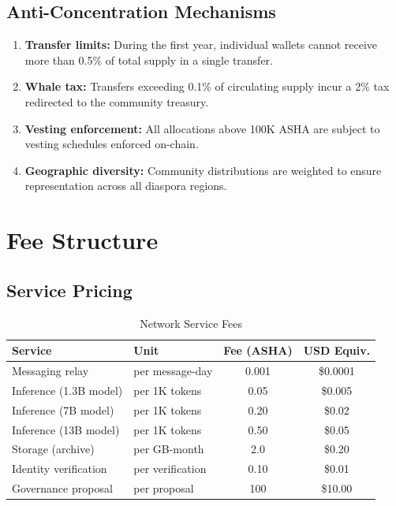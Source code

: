 \documentclass[11pt,a4paper]{article}
\begin{document}
\subsection{Anti-Concentration Mechanisms}

\begin{enumerate}
    \item \textbf{Transfer limits:} During the first year, individual wallets cannot receive more than 0.5\% of total supply in a single transfer.
    \item \textbf{Whale tax:} Transfers exceeding 0.1\% of circulating supply incur a 2\% tax redirected to the community treasury.
    \item \textbf{Vesting enforcement:} All allocations above 100K ASHA are subject to vesting schedules enforced on-chain.
    \item \textbf{Geographic diversity:} Community distributions are weighted to ensure representation across all diaspora regions.
\end{enumerate}

\section{Fee Structure}

\subsection{Service Pricing}

\begin{table}[H]
\centering
\caption{Network Service Fees}
\label{tab:fees}
\begin{tabular}{llcc}
\toprule
\textbf{Service} & \textbf{Unit} & \textbf{Fee (ASHA)} & \textbf{USD Equiv.} \\
\midrule
Messaging relay & per message-day & 0.001 & \$0.0001 \\
Inference (1.3B model) & per 1K tokens & 0.05 & \$0.005 \\
Inference (7B model) & per 1K tokens & 0.20 & \$0.02 \\
Inference (13B model) & per 1K tokens & 0.50 & \$0.05 \\
Storage (archive) & per GB-month & 2.0 & \$0.20 \\
Identity verification & per verification & 0.10 & \$0.01 \\
Governance proposal & per proposal & 100 & \$10.00 \\
\bottomrule
\end{tabular}
\end{table}
\end{document}
